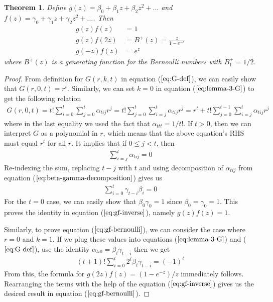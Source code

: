 \documentclass{article}
\newtheorem{theorem}{Theorem}
\begin{document}
\begin{theorem}
\label{theorem:beta-gamma-rel}
Define $g(z) = \beta_0 + \beta_1 z + \beta_2 z^2 + ...$ and $f(z) = \gamma_0 + \gamma_1 z + \gamma_2 z^2 + ...$. Then
\begin{align}
\label{eq:gf-inverse}
 g(z)f(z) &= 1 \\
\label{eq:gf-bernoulli}
g(z)f(2z) &= B^+(z) = \frac{z}{1 - e^{-z}} \\
\label{eq:g-negative}
g(-z)f(z) &= e^z
\end{align}
where $B^+(z)$ is a generating function for the Bernoulli numbers with $B_1^+ = 1/2$.
\end{theorem}
\begin{proof}
From definition for $G(r, k, t)$ in equation ($\ref{eq:G-def}$), we can easily show that $G(r, 0, t) = r^t$. Similarly, we can set $k=0$ in equation ($\ref{eq:lemma-3-G}$) to get the following relation
\begin{align*}
G(r, 0, t)
= t! \sum_{i=0}^t \sum_{j=0}^i \alpha_{tij} r^j
= t! \sum_{j=0}^{t} \sum_{i=j}^{t} \alpha_{tij} r^j
= r^t + t! \sum_{j=0}^{t-1} \sum_{i=j}^{t} \alpha_{tij} r^j
\end{align*}
where in the last equality we used the fact that $\alpha_{ttt} = 1/t!$. If $t > 0$, then we can interpret $G$ as a polynomial in $r$, which means that the above equation's RHS must equal $r^t$ for all $r$. It implies that if $0 \le j < t$, then
\begin{align*}
\sum_{i=j}^{t} \alpha_{tij} = 0
\end{align*}
Re-indexing the sum, replacing $t-j$ with $t$ and using decomposition of $\alpha_{tij}$ from equation ($\ref{eq:beta-gamma-decomposition}$) gives us 
\begin{align}
\label{eq:beta-gamma-1}
\sum_{i=0}^{t} \gamma_{t-i} \beta_{i} = 0
\end{align}
For the $t=0$ case, we can easily show that $\beta_0 \gamma_0 = 1$ since $\beta_0 = \gamma_0 = 1$. This proves the identity in equation ($\ref{eq:gf-inverse}$), namely $g(z)f(z) = 1$.

Similarly, to prove equation ($\ref{eq:gf-bernoulli}$), we can consider the case where $r = 0$ and $k=1$. If we plug these values into equations ($\ref{eq:lemma-3-G}$) and ($\ref{eq:G-def}$), use the identity $\alpha_{ti0} = \beta_{i} \gamma_{t-i}$ then we get
\begin{align}
\label{eq:beta-gamma-2}
(t+1)!\sum_{i=0}^t 2^i \beta_i \gamma_{t-i} = (-1)^t
\end{align}
From this, the formula for $g(2z)f(z)=(1-e^{-z})/z$ immediately follows. Rearranging the terms with the help of the equation ($\ref{eq:gf-inverse}$) gives us the desired result in equation ($\ref{eq:gf-bernoulli}$).


\end{proof}
\end{document}
